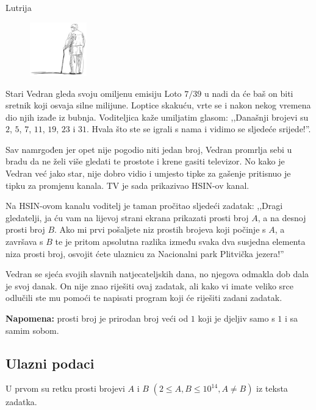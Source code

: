 \begin{statement}[
  problempoints=70,
  timelimit=1 sekunda,
  memorylimit=512 MiB,
]{Lutrija}

\setlength\intextsep{-0.1cm}
\begin{figure}
\centering
\includegraphics[width=0.22\textwidth]{img/vedran_kurdija.png}
\end{figure}

Stari Vedran gleda svoju omiljenu emisiju Loto $7/39$ u nadi da će baš on biti
sretnik koji osvaja silne milijune. Loptice skakuću, vrte se i nakon nekog
vremena dio njih izađe iz bubnja. Voditeljica kaže umiljatim glasom: ,,Današnji
brojevi su $2$, $5$, $7$, $11$, $19$, $23$ i $31$. Hvala što ste se igrali s
nama i vidimo se sljedeće srijede!''.

Sav namrgođen jer opet nije pogodio niti jedan broj, Vedran promrlja sebi u
bradu da ne želi više gledati te prostote i krene gasiti televizor. No kako je
Vedran već jako star, nije dobro vidio i umjesto tipke za gašenje pritisnuo je
tipku za promjenu kanala. TV je sada prikazivao HSIN-ov kanal.

Na HSIN-ovom kanalu voditelj je taman pročitao sljedeći zadatak: ,,Dragi
gledatelji, ja ću vam na lijevoj strani ekrana prikazati prosti broj $A$, a na
desnoj prosti broj $B$. Ako mi prvi pošaljete niz prostih brojeva koji počinje
s $A$, a završava s $B$ te je pritom apsolutna razlika između svaka dva susjedna
elementa niza prosti broj, osvojit ćete ulaznicu za Nacionalni park Plitvička
jezera!''

Vedran se sjeća svojih slavnih natjecateljskih dana, no njegova odmakla dob
dala je svoj danak. On nije znao riješiti ovaj zadatak, ali kako vi imate veliko
srce odlučili ste mu pomoći te napisati program koji će riješiti zadani zadatak.

\textbf{Napomena:} prosti broj je prirodan broj veći od $1$ koji je djeljiv samo
s $1$ i sa samim sobom.


\subsection*{Ulazni podaci}
U prvom su retku prosti brojevi $A$ i $B$ $(2 \le A, B \le 10^{14}, A \ne B)$ iz teksta
zadatka.


\end{statement}
